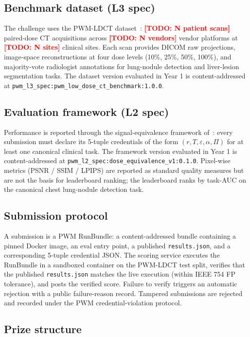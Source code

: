\documentclass[twoside,11pt]{article}
\newcommand{\todo}[1]{\textcolor{red}{\textbf{[TODO: #1]}}}
\begin{document}
\subsection{Benchmark dataset (L3 spec)}

The challenge uses the PWM-LDCT dataset~\citep{ws1dataset}: \todo{N patient scans} paired-dose CT acquisitions across \todo{N vendors} vendor platforms at \todo{N sites} clinical sites. Each scan provides DICOM raw projections, image-space reconstructions at four dose levels (10\%, 25\%, 50\%, 100\%), and majority-vote radiologist annotations for lung-nodule detection and liver-lesion segmentation tasks. The dataset version evaluated in Year 1 is content-addressed at \texttt{pwm\_l3\_spec:pwm\_low\_dose\_ct\_benchmark:1.0.0}.

\subsection{Evaluation framework (L2 spec)}

Performance is reported through the signal-equivalence framework of~\citep{ws2framework}: every submission must declare its 5-tuple credentials of the form $(r, T, \varepsilon, \alpha, \Pi)$ for at least one canonical clinical task. The framework version evaluated in Year 1 is content-addressed at \texttt{pwm\_l2\_spec:dose\_equivalence\_v1:0.1.0}. Pixel-wise metrics (PSNR / SSIM / LPIPS) are reported as standard quality measures but are not the basis for leaderboard ranking; the leaderboard ranks by task-AUC on the canonical chest lung-nodule detection task.

\subsection{Submission protocol}

A submission is a PWM RunBundle: a content-addressed bundle containing a pinned Docker image, an eval entry point, a published \texttt{results.json}, and a corresponding 5-tuple credential JSON. The scoring service executes the RunBundle in a sandboxed container on the PWM-LDCT test split, verifies that the published \texttt{results.json} matches the live execution (within IEEE 754 FP tolerance), and posts the verified score. Failure to verify triggers an automatic rejection with a public failure-reason record. Tampered submissions are rejected and recorded under the PWM credential-violation protocol.

\subsection{Prize structure}
\end{document}
